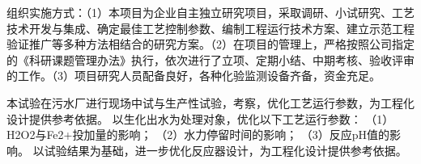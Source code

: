 组织实施方式：（1）本项目为企业自主独立研究项目，采取调研、小试研究、工艺技术开发与集成、确定最佳工艺控制参数、编制工程运行技术方案、建立示范工程验证推广等多种方法相结合的研究方案。（2）在项目的管理上，严格按照公司指定的《科研课题管理办法》执行，依次进行了立项、定期小结、中期考核、验收评审的工作。（3）项目研究人员配备良好，各种化验监测设备齐备，资金充足。\par

本试验在污水厂进行现场中试与生产性试验，考察，优化工艺运行参数，为工程化设计提供参考依据。
以生化出水为处理对象，优化以下工艺运行参数：
（1）H2O2与Fe2+投加量的影响；
（2）水力停留时间的影响；
（3）反应pH值的影响。
以试验结果为基础，进一步优化反应器设计，为工程化设计提供参考依据。
